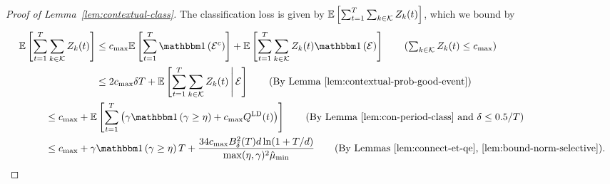 \begin{proof}[Proof of Lemma~\ref{lem:contextual-class}]
The classification loss is given by $\mathbb E\left[\sum_{t=1}^T\sum_{k \in \mathcal{K}} Z_k(t)\right]$, which we bound by
\begin{align*}
\expect{\sum_{t=1}^T\sum_{k \in \set{K}} Z_k(t)} &\leq  c_{\max}\expect{\sum_{t=1}^T \indic{\set{E}^c}} + \expect{\sum_{t=1}^T \sum_{k \in \set{K}} Z_k(t)\indic{\set{E}}}  \tag{$\sum_{k \in \set{K}} Z_k(t) \leq c_{\max}$}\\
&\leq 2c_{\max} \delta T+ \expect{\sum_{t=1}^T \sum_{k \in \set{K}} Z_k(t)\mid \set{E}} \tag{By Lemma~\ref{lem:contextual-prob-good-event}}\\
&\hspace{-0.7in}\leq c_{\max} + \expect{\sum_{t=1}^T \left(\gamma \indic{\gamma \geq \eta} + c_{\max}Q^{\ld}(t)\right)} \tag{By Lemma~\ref{lem:con-period-class} and $\delta \leq 0.5 / T$} \\
&\hspace{-0.7in}\leq c_{\max} + \gamma \indic{\gamma \geq \eta} T + \frac{34c_{\max}B_{\delta}^2(T)d\ln(1+T/d)}{\max(\eta,\gamma)^2\hat{\mu}_{\min}} \tag{By Lemmas~\ref{lem:connect-et-qe},~\ref{lem:bound-norm-selective}}.
\end{align*}
\end{proof}

